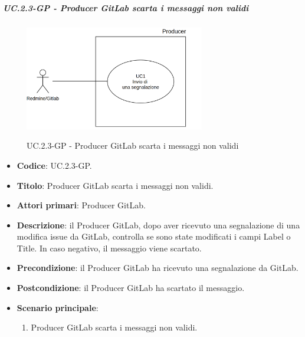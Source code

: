 			\subparagraph{UC\theuccount.2.3-GP - Producer GitLab scarta i messaggi non validi}
				\begin{figure}[H]
					\centering
					\includegraphics[width=0.7\textwidth]{img/UC1.png}\\
					\caption{UC\theuccount.2.3-GP - Producer GitLab scarta i messaggi non validi}
				\end{figure}
				\begin{itemize}
					\item \textbf{Codice}: UC\theuccount.2.3-GP.
					\item \textbf{Titolo}: Producer GitLab scarta i messaggi non validi.
					\item \textbf{Attori primari}: Producer GitLab.
					\item \textbf{Descrizione}: il Producer GitLab, dopo aver ricevuto una segnalazione di una modifica issue da GitLab, controlla
					se sono state modificati i campi Label o Title. In caso negativo, il messaggio viene scartato.
					\item \textbf{Precondizione}: il Producer GitLab ha ricevuto una segnalazione da GitLab.
					\item \textbf{Postcondizione}: il Producer GitLab ha scartato il messaggio.
					\item \textbf{Scenario principale}: 
					\begin{enumerate}
						\item Producer GitLab scarta i messaggi non validi.
					\end{enumerate}
				\end{itemize}